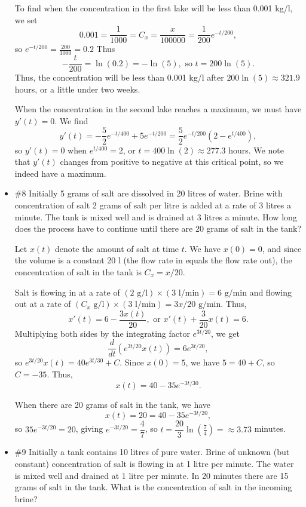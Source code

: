 \documentclass[12pt,letterpaper]{article}
\begin{document}
\begin{itemize}
\medskip

To find when the concentration in the first lake will be less than 0.001 kg/l, we set
\[
0.001 = \frac{1}{1000} = C_x = \frac{x}{100000} = \frac{1}{200}e^{-t/200},
\]
so $e^{-t/200} = \frac{200}{1000} = 0.2$ Thus
\[
-\frac{t}{200} = \ln(0.2) = -\ln(5), \text{ so } t=200\ln(5).
\]
Thus, the concentration will be less than 0.001 kg/l after $200\ln(5)\approx 321.9$ hours, or a little under two weeks.

\medskip

When the concentration in the second lake reaches a maximum, we must have $y'(t)=0$. We find
\[
y'(t) = -\frac52 e^{-t/400}+5e^{-t/200} = \frac52 e^{-t/200}(2-e^{t/400}),
\]
so $y'(t)=0$ when $e^{t/400}=2$, or $t=400\ln(2)\approx 277.3$ hours. We note that $y'(t)$ changes from positive to negative at this critical point, so we indeed have a maximum. 

\item \#8 Initially 5 grams of salt are dissolved in 20 litres of water.
Brine with concentration of salt 2 grams of salt per litre is
added at a rate of 3 litres a minute. The tank is mixed well
and is drained at 3 litres a minute. How long does the process have to continue until there are 20 grams of salt in the
tank?

\bigskip

Let $x(t)$ denote the amount of salt at time $t$. We have $x(0)=0$, and since the volume is a constant 20 l (the flow rate in equals the flow rate out), the concentration of salt in the tank is $C_x = x/20$. 

Salt is flowing in at a rate of $(2\text{ g/l})\times (3\text{ l/min})=6\text{ g/min}$ and flowing out at a rate of $(C_x\text{ g/l})\times (3\text{ l/min}) = 3x/20\text{ g/min}$. Thus,
\[
x'(t) = 6-\frac{3x(t)}{20}, \text{ or } x'(t)+\frac{3}{20}x(t)=6.
\]
Multiplying both sides by the integrating factor $e^{3t/20}$, we get
\[
\frac{d}{dt}(e^{3t/20}x(t))=6e^{3t/20},
\]
so $e^{3t/20}x(t) = 40e^{3t/30}+C$. Since $x(0)=5$, we have $5=40+C$, so $C=-35$. Thus,
\[
x(t) = 40-35e^{-3t/30}.
\]

\medskip

When there are 20 grams of salt in the tank, we have 
\[
x(t)=20=40-35e^{-3t/20},
\]
so $35e^{-3t/20}=20$, giving $e^{-3t/20}=\dfrac47$, so $t=\dfrac{20}{3}\ln\left(\frac{7}{4}\right)=\approx 3.73$ minutes.

\item \#9 Initially a tank contains 10 litres of pure water. Brine of unknown (but constant) concentration of salt is flowing in at
1 litre per minute. The water is mixed well and drained at 1
litre per minute. In 20 minutes there are 15 grams of salt in
the tank. What is the concentration of salt in the incoming
brine?


\end{itemize}
\end{document}
